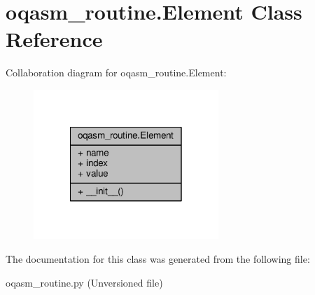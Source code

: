 \hypertarget{classoqasm__routine_1_1Element}{\section{oqasm\-\_\-routine.\-Element Class Reference}
\label{classoqasm__routine_1_1Element}
}


Collaboration diagram for oqasm\-\_\-routine.\-Element\-:
\nopagebreak
\begin{figure}[H]
\begin{center}
\leavevmode
\includegraphics[width=198pt]{de/dd3/classoqasm__routine_1_1Element__coll__graph}
\end{center}
\end{figure}


The documentation for this class was generated from the following file\-:\begin{DoxyCompactItemize}
\item 
oqasm\-\_\-routine.\-py (\-Unversioned file)\end{DoxyCompactItemize}
